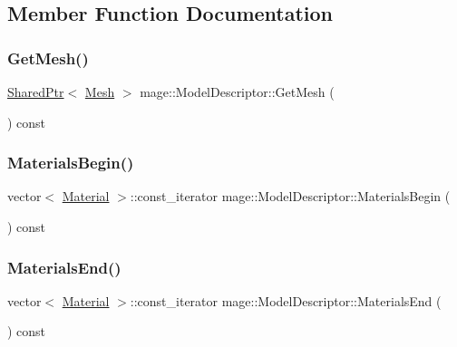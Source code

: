 \subsection{Member Function Documentation}
\hypertarget{classmage_1_1_model_descriptor_a325f0e58fda7734ace7a0e296e0d970d}{}\label{classmage_1_1_model_descriptor_a325f0e58fda7734ace7a0e296e0d970d} 
\subsubsection{\texorpdfstring{Get\+Mesh()}{GetMesh()}}
{\footnotesize\ttfamily \hyperlink{namespacemage_a1e01ae66713838a7a67d30e44c67703e}{Shared\+Ptr}$<$ \hyperlink{classmage_1_1_mesh}{Mesh} $>$ mage\+::\+Model\+Descriptor\+::\+Get\+Mesh (\begin{DoxyParamCaption}{ }\end{DoxyParamCaption}) const}

\hypertarget{classmage_1_1_model_descriptor_a64a2ca531c03cd8d79eda3a728e6efa1}{}\label{classmage_1_1_model_descriptor_a64a2ca531c03cd8d79eda3a728e6efa1} 
\subsubsection{\texorpdfstring{Materials\+Begin()}{MaterialsBegin()}}
{\footnotesize\ttfamily vector$<$ \hyperlink{structmage_1_1_material}{Material} $>$\+::const\+\_\+iterator mage\+::\+Model\+Descriptor\+::\+Materials\+Begin (\begin{DoxyParamCaption}{ }\end{DoxyParamCaption}) const}

\hypertarget{classmage_1_1_model_descriptor_a3e1880190d58d4d1bc308766f804047d}{}\label{classmage_1_1_model_descriptor_a3e1880190d58d4d1bc308766f804047d} 
\subsubsection{\texorpdfstring{Materials\+End()}{MaterialsEnd()}}
{\footnotesize\ttfamily vector$<$ \hyperlink{structmage_1_1_material}{Material} $>$\+::const\+\_\+iterator mage\+::\+Model\+Descriptor\+::\+Materials\+End (\begin{DoxyParamCaption}{ }\end{DoxyParamCaption}) const}

